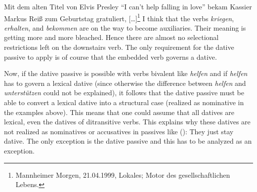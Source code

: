 \ex
Mit dem alten Titel von Elvis Presley "`I can't help falling in love"' bekam Kassier Markus Reiß zum Geburtstag gratuliert, [\ldots]\footnote{
Mannheimer Morgen, 21.04.1999, Lokales; Motor des gesellschaftlichen Lebens.%
}
\zl
I think that the verbs \emph{kriegen}, \emph{erhalten}, and \emph{bekommen} are on the way to become
auxiliaries. Their meaning is getting more and more bleached. Hence there are almost no selectional
restrictions left on the downstairs verb. The only requirement for the dative passive to apply is of
course that the embedded verb governs a dative.

Now, if the dative passive is possible with verbs bivalent like \emph{helfen} and if \emph{helfen}
has to govern a lexical dative (since otherwise the difference between \emph{helfen} and
\emph{unterstützen} could not be explained), it follows that the dative passive must be able to
convert a lexical dative into a structural case (realized as nominative in the examples above). This
means that one could assume that all datives are lexical, even the datives of ditransitive
verbs. This explains why these datives are not realized as nominatives or accusatives in passives
like ():
\eal
{}
\zl
They just stay dative. The only exception is the dative passive and this has to be analyzed as an exception.





